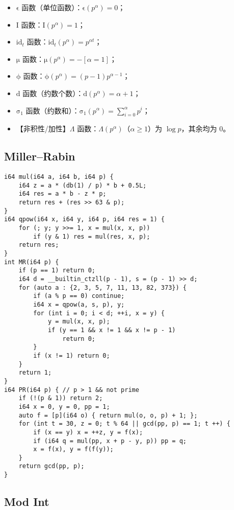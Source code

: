 \documentclass[a4paper,landscape,twocolumn]{ctexart}
\begin{document}
\begin{itemize}
\item $\mathrm{\epsilon}$ 函数（单位函数）：$\mathrm{\epsilon} (p ^ \alpha) = 0$；
\item $\mathrm{I}$ 函数：$\mathrm{I} (p ^ \alpha) = 1$；
\item $\mathrm{id}_t$ 函数：$\mathrm{id}_t (p ^ \alpha) = p ^ {\alpha t}$；
\item $\mathrm{\mu}$ 函数：$\mathrm{\mu} (p ^ \alpha) = - \left [ \alpha = 1 \right ]$；
\item $\mathrm{\phi}$ 函数：$\mathrm{\phi} (p ^ \alpha) = (p - 1) p ^ {\alpha - 1}$；
\item $\mathrm{d}$ 函数（约数个数）：$\mathrm{d} (p ^ \alpha) = \alpha + 1$；
\item $\mathrm{\sigma}_1$ 函数（约数和）：$\mathrm{\sigma}_1 (p ^ \alpha) = \sum_{i = 0}^{\alpha} p ^ i$；
\item 【非积性/加性】$\Lambda$ 函数：$\Lambda (p ^ \alpha)$（$\alpha \geq 1$）为 $\log p$，其余均为 $0$。
\end{itemize}

\subsection{Miller–Rabin}

\begin{lstlisting}
i64 mul(i64 a, i64 b, i64 p) {
	i64 z = a * (db(1) / p) * b + 0.5L;
	i64 res = a * b - z * p;
	return res + (res >> 63 & p);
}
i64 qpow(i64 x, i64 y, i64 p, i64 res = 1) {
	for (; y; y >>= 1, x = mul(x, x, p))
		if (y & 1) res = mul(res, x, p);
	return res;
}
int MR(i64 p) {
	if (p == 1) return 0;
	i64 d = __builtin_ctzll(p - 1), s = (p - 1) >> d;
	for (auto a : {2, 3, 5, 7, 11, 13, 82, 373}) {
		if (a % p == 0) continue;
		i64 x = qpow(a, s, p), y;
		for (int i = 0; i < d; ++i, x = y) {
			y = mul(x, x, p);
			if (y == 1 && x != 1 && x != p - 1)
				return 0;
		}
		if (x != 1) return 0;
	}
	return 1;
}
i64 PR(i64 p) { // p > 1 && not prime
	if (!(p & 1)) return 2;
	i64 x = 0, y = 0, pp = 1;
	auto f = [p](i64 o) { return mul(o, o, p) + 1; };
	for (int t = 30, z = 0; t % 64 || gcd(pp, p) == 1; t ++) {
		if (x == y) x = ++z, y = f(x);
		if (i64 q = mul(pp, x + p - y, p)) pp = q;
		x = f(x), y = f(f(y));
	}
	return gcd(pp, p);
}
\end{lstlisting}

\subsection{Mod Int}
\end{document}
